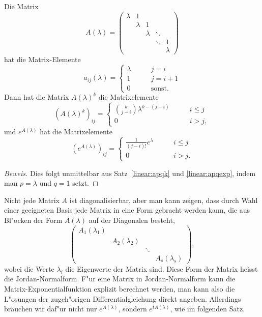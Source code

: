 \begin{satz}
\label{linear:jnfexp}
Die Matrix
\[
A(\lambda)=\begin{pmatrix}
\lambda&      1&       &      &       \\
       &\lambda&      1&      &       \\
       &       &\lambda&\ddots&       \\
       &       &       &\ddots&      1\\
       &       &       &      &\lambda
\end{pmatrix}
\]
hat die Matrix-Elemente
\[
a_{ij}(\lambda)=\begin{cases}
\lambda&\qquad j=i\\
      1&\qquad j=i+1\\
      0&\qquad \text{sonst.}
\end{cases}
\]
Dann hat die Matrix $A(\lambda)^k$ die Matrixelemente
\begin{equation}
(A(\lambda)^k)_{ij}=\begin{cases}
\displaystyle \binom{k}{j-i}\lambda^{k-(j-i)}&\qquad i\le j\\
0&\qquad i > j,
\end{cases}
\label{linear:ahochk}
\end{equation}
und $e^{A(\lambda)}$ hat die Matrixelemente
\[
(e^{A(\lambda)})_{ij}
=
\begin{cases}
\frac{1}{(j-i)!}e^\lambda &\qquad i\le j\\
0                         &\qquad i>j.
\end{cases}
\]
\end{satz}

\begin{proof}[Beweis]
Dies folgt unmittelbar aus Satz~\ref{linear:apqk} und \ref{linear:apqexp},
indem man $p=\lambda$ und $q=1$ setzt.
\end{proof}

Nicht jede Matrix $A$ ist diagonalisierbar, aber man kann zeigen, dass
durch Wahl einer geeigneten Basis jede Matrix in eine Form gebracht
werden kann, die aus Bl"ocken der Form $A(\lambda)$ auf der Diagonalen
besteht,
\[
\begin{pmatrix}
A_1(\lambda_1)&              &      &              \\
              &A_2(\lambda_2)&      &              \\
              &              &\ddots&              \\
              &              &      &A_s(\lambda_s)
\end{pmatrix},
\]
wobei die Werte $\lambda_i$ die Eigenwerte der Matrix sind.
Diese Form der Matrix heisst die Jordan-Normalform.
%
F"ur eine Matrix in Jordan-Normalform kann die Matrix-Exponentialfunktion
explizit berechnet werden, man kann also die L"osungen der
zugeh"origen Differentialgleichung direkt angeben.
Allerdings brauchen wir daf"ur nicht nur $e^{A(\lambda)}$, sondern
$e^{tA(\lambda)}$, wie im folgenden Satz.


